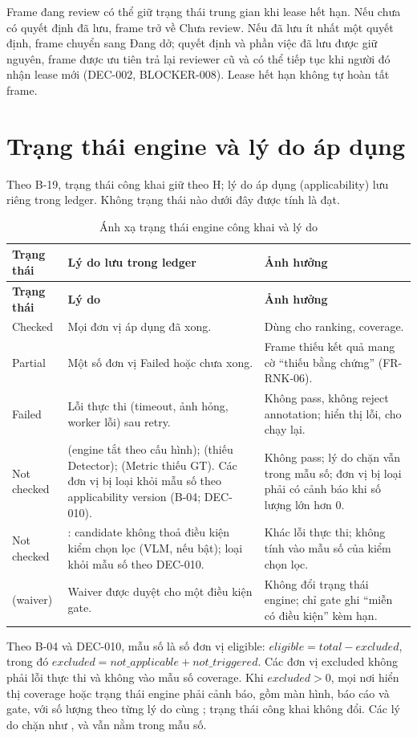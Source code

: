 Frame đang review có thể giữ trạng thái trung gian khi lease hết hạn. Nếu chưa có
quyết định đã lưu, frame trở về Chưa review. Nếu đã lưu ít nhất một quyết định,
frame chuyển sang Đang dở; quyết định và phần việc đã lưu được giữ nguyên, frame
được ưu tiên trả lại reviewer cũ và có thể tiếp tục khi người đó nhận lease mới
(DEC-002, BLOCKER-008). Lease hết hạn không tự hoàn tất frame.

\section{Trạng thái engine và lý do áp dụng}
\label{sec:enginestates}
Theo B-19, trạng thái công khai giữ theo H; lý do áp dụng (applicability) lưu
riêng trong ledger. Không trạng thái nào dưới đây được tính là đạt.

\begin{xltabular}{\linewidth}{@{}L{2.4cm}L{4.6cm}Y@{}}
\caption{Ánh xạ trạng thái engine công khai và lý do}\label{tab:enginestates}\\
\toprule
\textbf{Trạng thái} & \textbf{Lý do lưu trong ledger} & \textbf{Ảnh hưởng}\\
\midrule
\endfirsthead
\toprule \textbf{Trạng thái} & \textbf{Lý do} & \textbf{Ảnh hưởng}\\ \midrule
\endhead
\bottomrule
\endfoot
Checked & Mọi đơn vị áp dụng đã xong. & Dùng cho ranking, coverage.\\
Partial & Một số đơn vị Failed hoặc chưa xong. & Frame thiếu kết quả mang cờ ``thiếu bằng chứng'' (FR-RNK-06).\\
Failed & Lỗi thực thi (timeout, ảnh hỏng, worker lỗi) sau retry. & Không pass, không reject annotation; hiển thị lỗi, cho chạy lại.\\
Not checked &  (engine tắt theo cấu hình);  (thiếu Detector);  (Metric thiếu GT). Các đơn vị  bị loại khỏi mẫu số theo applicability version (B-04; DEC-010). & Không pass; lý do chặn vẫn trong mẫu số; đơn vị bị loại phải có cảnh báo khi số lượng lớn hơn 0.\\
Not checked & : candidate không thoả điều kiện kiểm chọn lọc (VLM, nếu bật); loại khỏi mẫu số theo DEC-010. & Khác lỗi thực thi; không tính vào mẫu số của kiểm chọn lọc.\\
(waiver) & Waiver được duyệt cho một điều kiện gate. & Không đổi trạng thái engine; chỉ gate ghi ``miễn có điều kiện'' kèm hạn.\\
\end{xltabular}

Theo B-04 và DEC-010, mẫu số là số đơn vị eligible: \(eligible = total - excluded\),
trong đó \(excluded = not\_applicable + not\_triggered\). Các đơn vị excluded
không phải lỗi thực thi và không vào mẫu số coverage. Khi
\(excluded > 0\), mọi nơi hiển thị
coverage hoặc trạng thái engine phải cảnh báo, gồm màn hình, báo cáo và gate, với
số lượng theo từng lý do cùng ;
trạng thái công khai không đổi. Các lý do chặn như , 
và  vẫn nằm trong mẫu số.
